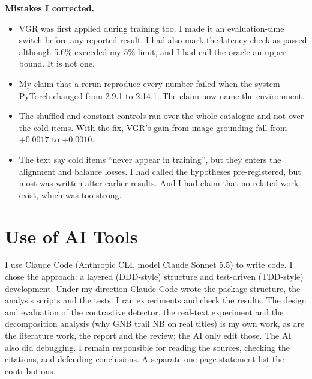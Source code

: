 \documentclass[conference]{IEEEtran}
\begin{document}
\textbf{Mistakes I corrected.}
\begin{itemize}
\item VGR was first applied during training too. I made it an evaluation-time switch before any reported result. I had also mark the latency check as passed although 5.6\% exceeded my 5\% limit, and I had call the oracle an upper bound. It is not one.
\item My claim that a rerun reproduce every number failed when the system PyTorch changed from 2.9.1 to 2.14.1. The claim now name the environment.
\item The shuffled and constant controls ran over the whole catalogue and not over the cold items. With the fix, VGR's gain from image grounding fall from $+0.0017$ to $+0.0010$.
\item The text say cold items ``never appear in training'', but they enters the alignment and balance losses. I had called the hypotheses pre-registered, but most was written after earlier results. And I had claim that no related work exist, which was too strong.
\end{itemize}


\section*{Use of AI Tools}
I use Claude Code (Anthropic CLI, model Claude Sonnet 5.5) to write code. I chose the approach: a layered (DDD-style) structure and test-driven (TDD-style) development. Under my direction Claude Code wrote the package structure, the analysis scripts and the tests. I ran experiments and check the results. The design and evaluation of the contrastive detector, the real-text experiment and the decomposition analysis (why GNB trail NB on real titles) is my own work, as are the literature work, the report and the review; the AI only edit those. The AI also did debugging. I remain responsible for reading the sources, checking the citations, and defending conclusions. A separate one-page statement list the contributions.
\end{document}
